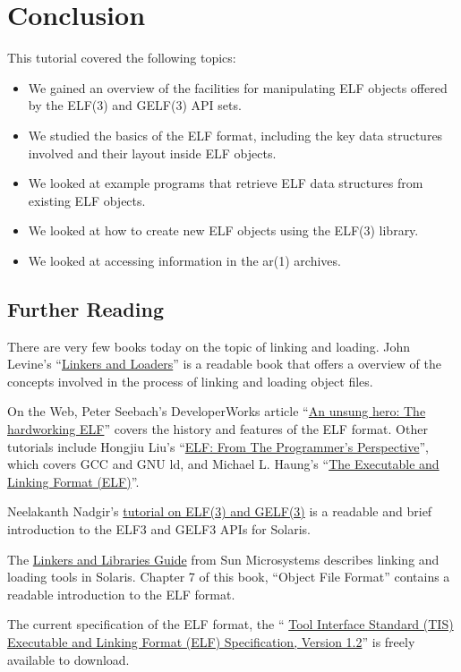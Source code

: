 \documentclass[a4paper]{book}
\newcommand{\reg}{\textregistered\xspace}
\newcommand{\trade}{\texttrademark\xspace}
\begin{document}
\chapter{Conclusion}\label{chap.conclusion}
This tutorial covered the following topics:
\begin{itemize}
\item We gained an overview of the facilities for manipulating ELF
  objects offered by the ELF(3) and GELF(3) API sets.
\item We studied the basics of the ELF format, including the key data
  structures involved and their layout inside ELF objects.
\item We looked at example programs that retrieve ELF data structures
  from existing ELF objects.
\item We looked at how to create new ELF objects using the ELF(3)
  library.
\item We looked at accessing information in the ar(1) archives.
\end{itemize}

\section{Further Reading}
There are very few books today on the topic of linking and loading.
John Levine's ``\href{http://linker.iecc.com/}{Linkers and Loaders}''
is a readable book that offers a overview of the concepts involved in
the process of linking and loading object files.

On the Web, Peter Seebach's DeveloperWorks article
``\href{http://www-128.ibm.com/developerworks/power/library/pa-spec12/index.html}{An
  unsung hero: The hardworking ELF}'' covers the history and features
of the ELF format.  Other tutorials include Hongjiu Liu's
``\href{http://linux4u.jinr.ru/usoft/WWW/www_debian.org/Documentation/elf/elf.html}{ELF:
  From The Programmer's Perspective}'', which covers GCC and GNU ld,
and Michael L. Haung's
``\href{http://www.cs.ucdavis.edu/~haungs/paper/node10.html}{The
  Executable and Linking Format (ELF)}''.

Neelakanth Nadgir's
\href{http://developers.sun.com/solaris/articles/elf.html}
{tutorial on ELF(3) and GELF(3)} is a readable and brief introduction
to the ELF{3} and GELF{3} APIs for Solaris\trade.

The
\href{http://docsun.cites.uiuc.edu/sun_docs/C/solaris_9/SUNWdev/LLM/toc.html}{Linkers
  and Libraries Guide} from Sun Microsystems\reg describes linking and
loading tools in Solaris\trade.  Chapter 7 of this book, ``Object File
Format'' contains a readable introduction to the ELF format.

The current specification of the ELF format, the ``%
\href{http://www.x86.org/ftp/manuals/tools/elf.pdf}{Tool Interface
  Standard (TIS) Executable and Linking Format (ELF) Specification,
  Version 1.2}'' is freely available to download.
\end{document}
